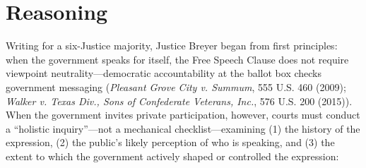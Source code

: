 \documentclass[12pt]{article}
\begin{document}
\section{Reasoning}
Writing for a six-Justice majority, Justice Breyer began from first principles: when the government speaks for itself, the Free Speech Clause does not require viewpoint neutrality---democratic accountability at the ballot box checks government messaging (\textit{Pleasant Grove City v. Summum}, 555 U.S. 460 (2009); \textit{Walker v. Texas Div., Sons of Confederate Veterans, Inc.}, 576 U.S. 200 (2015)). When the government invites private participation, however, courts must conduct a ``holistic inquiry''---not a mechanical checklist---examining (1) the history of the expression, (2) the public's likely perception of who is speaking, and (3) the extent to which the government actively shaped or controlled the expression:
\end{document}
